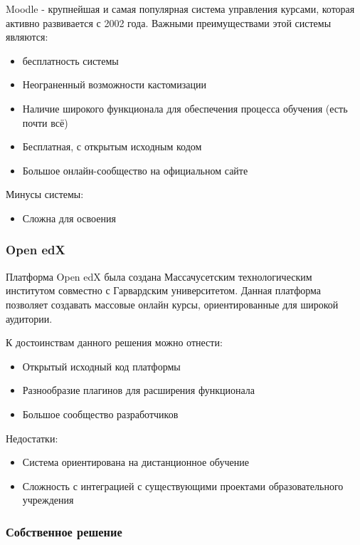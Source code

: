 \documentclass[a4paper,14pt]{article}
\begin{document}
Moodle - крупнейшая и самая популярная система управления курсами, которая активно развивается с 2002 года. Важными преимуществами этой системы являются:

\begin{itemize}
	\item бесплатность системы
	\item Неограненный возможности кастомизации
	\item Наличие широкого функционала для обеспечения процесса обучения (есть почти всё)
	\item Бесплатная, с открытым исходным кодом
	\item Большое онлайн-сообщество на официальном сайте
	
\end{itemize} 

Минусы системы:

\begin{itemize}
	\item Сложна для освоения	
\end{itemize} 


\subsubsection{Open edX} 

Платформа Open edX была создана Массачусетским технологическим институтом совместно с Гарвардским университетом.
Данная платформа позволяет создавать массовые онлайн курсы, ориентированные для широкой аудитории.

К достоинствам данного решения можно отнести:

\begin{itemize}
	\item Открытый исходный код платформы
	\item Разнообразие плагинов для расширения функционала
	\item Большое сообщество разработчиков
\end{itemize}

Недостатки:

\begin{itemize}
	\item Система ориентирована на дистанционное обучение
	\item Сложность с интеграцией с существующими проектами образовательного учреждения
\end{itemize}

\subsubsection{Собственное решение} 
\end{document}
